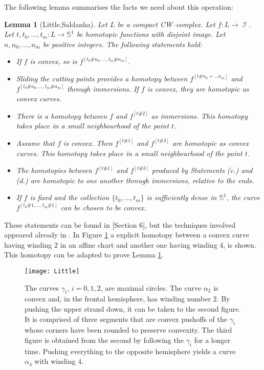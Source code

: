 \documentclass[10pt]{amsart}
\newcommand{\Imm}{\operatorname{\mathcal{I}}}
\newcommand{\NS}{{\mathbb{S}}}
\newtheorem{lemma}{Lemma}
\theoremstyle{definition}
\begin{document}
The following lemma summarises the facts we need about this operation:
\begin{lemma}[Little,Saldanha] \label{lem:Little}
Let $L$ be a compact CW--complex. Let $f: L \to \Imm$. Let $t,t_0,\dots,t_m: L \to \NS^1$ be homotopic functions with disjoint image. Let $n,n_0,\dots,n_m$ be positive integers. The following statements hold:
\begin{itemize}
\item[a.] If $f$ is convex, so is $f^{[t_0\#n_0,\dots,t_m\#n_m]}$.
\item[b.] Sliding the cutting points provides a homotopy between $f^{[t\#n_0+\dots n_m]}$ and $f^{[t_0\#n_0,\dots,t_m\#n_m]}$ through immersions. If $f$ is convex, they are homotopic as convex curves.
\item[c.] There is a homotopy between $f$ and $f^{[t\#2]}$ as immersions. This homotopy takes place in a small neighbourhood of the point $t$.
\item[d.] Assume that $f$ is convex. Then $f^{[t\#1]}$ and $f^{[t\#3]}$ are homotopic as convex curves. This homotopy takes place in a small neighbourhood of the point $t$.
\item[e.] The homotopies between $f^{[t\#1]}$ and $f^{[t\#3]}$ produced by Statements (c.) and (d.) are homotopic to one another through immersions, relative to the ends.
\item[f.] If $f$ is fixed and the collection $\{t_0,\dots,t_m\}$ is sufficiently dense in $\NS^1$, the curve $f^{[t_0\#1,\dots,t_m\#1]}$ can be chosen to be convex.
\end{itemize}
\end{lemma}
These statements can be found in \cite{Sal}[Section 6], but the techniques involved appeared already in \cite{Li}. In Figure \ref{fig:Little} a explicit homotopy between a convex curve having winding 2 in an affine chart and another one having winding 4, is shown. This homotopy can be adapted to prove Lemma \ref{lem:Little}.

\begin{figure}[ht] 
\centering
\texttt{[image: Little]}
\caption{The curves $\gamma_i$, $i=0,1,2$, are maximal circles. The curve $\alpha_2$ is convex and, in the frontal hemisphere, has winding number $2$. By pushing the upper strand down, it can be taken to the second figure. It is comprised of three segments that are convex pushoffs of the $\gamma_i$ whose corners have been rounded to preserve convexity. The third figure is obtained from the second by following the $\gamma_i$ for a longer time. Pushing everything to the opposite hemisphere yields a curve $\alpha_4$ with winding $4$.}
\label{fig:Little}
\end{figure}
\end{document}
